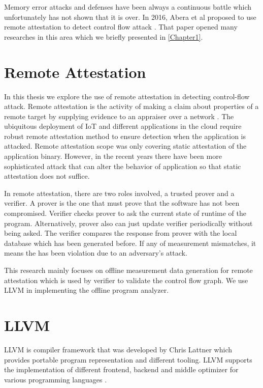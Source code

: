 Memory error attacks and defenses have been always a continuous battle which unfortunately has not shown that it is over. In 2016, Abera et al proposed to use remote attestation to detect control flow attack \cite{aberaCFLATControlFlowAttestation2016}. That paper opened many researches in this area which we briefly presented in \ref{Chapter1}.
 
\section{Remote Attestation}
In this thesis we explore the use of remote attestation in detecting control-flow attack. Remote attestation is the activity of making a claim about properties of a remote target by supplying evidence to an appraiser over a network \cite{cokerPrinciplesRemoteAttestation2011a}. The ubiquitous deployment of IoT and different applications in the cloud require robust remote attestation method to ensure detection when the application is attacked.  Remote attestation scope was only covering static attestation of the application binary. However, in the recent years there have been more sophisticated attack that can alter the behavior of application so that static attestation does not suffice. 

In remote attestation, there are two roles involved, a trusted prover and a verifier. A prover is the one that must prove that the software has not been compromised. Verifier checks prover to ask the current state of runtime of the program. Alternatively, prover also can just update verifier periodically without being asked. The verifier compares the response from prover with the local database which has been generated before. If any of measurement mismatches, it means the has been violation due to an adversary's attack.

This research mainly focuses on offline measurement data generation for remote attestation which is used by verifier to validate the control flow graph. We use LLVM in implementing the offline program analyzer.

\section{LLVM}

LLVM is compiler framework that was developed by Chris Lattner which provides portable program representation and different tooling. LLVM supports the implementation of different frontend, backend and middle optimizer for various programming languages \cite{lattnerLLVMCompilationFramework2004a}. 

